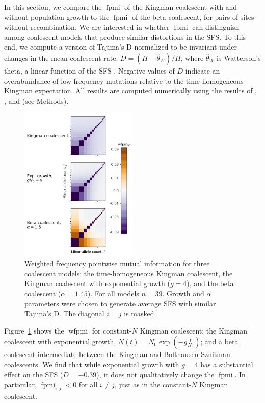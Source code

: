 \documentclass[11pt, letterpaper]{article}   	%
\newcommand{\Fig}[1]{Figure~\ref{#1}}
\DeclareMathOperator{\fpmi}{fpmi}
\DeclareMathOperator{\wfpmi}{wfpmi}
\begin{document}
In this section, we compare the $\fpmi$ of the Kingman coalescent with and without population growth to the $\fpmi$ of the beta coalescent, for pairs of sites without recombination.
We are interested in whether $\fpmi$ can distinguish among coalescent models that produce similar distortions in the SFS.
To this end, we compute a version of Tajima's D \autocite{Tajima1983} normalized to be invariant under changes in the mean coalescent rate: $D = (\Pi - \hat{\theta}_W) / \Pi$, where $\hat{\theta}_W$ is Watterson's theta, a linear function of the SFS \autocite{Watterson19??}.
Negative values of $D$ indicate an overabundance of low-frequency mutations relative to the time-homogeneous Kingman expectation.
All results are computed numerically using the results of \cite{Fu1995}, \cite{ZivkovicWiehe2008}, and \cite{BirknerEtAl2013} (see Methods).

\begin{figure}
\centering
\includegraphics[width=0.5\textwidth]{figures/wfpmi_growth_beta.pdf}
\caption{Weighted frequency pointwise mutual information for three coalescent models: the time-homogeneous Kingman coalescent, the Kingman coalescent with exponential growth ($g=4$), and the beta coalescent ($\alpha=1.45$). For all models $n=39$. Growth and $\alpha$ parameters were chosen to generate average SFS with similar Tajima's D. The diagonal $i=j$ is masked. \label{fig:nonrecombining_pmi}}
\end{figure}

\Fig{fig:nonrecombining_pmi} shows the $\wfpmi$ for constant-$N$ Kingman coalescent; the Kingman coalescent with exponential growth, $N(t)=N_0 \exp(-g \frac{t}{N_0})$; and a beta coalescent intermediate between the Kingman and Bolthausen-Sznitman coalescents.
We find that while exponential growth with $g=4$ has a substantial effect on the SFS ($D = -0.39$), it does not qualitatively change the $\fpmi$.
In particular, $\fpmi_{i,j} < 0$ for all $i \neq j$, just as in the constant-$N$ Kingman coalescent.
\end{document}
